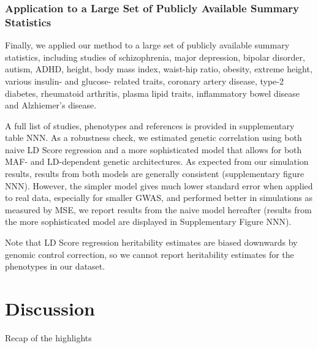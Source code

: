 \documentclass[11pt]{article}
\begin{document}
\subsubsection{Application to a Large Set of Publicly Available Summary Statistics}
Finally, we applied our method to a large set of publicly available summary statistics, 
including studies of 
schizophrenia\cite{schizophrenia2014biological}, 
major depression\cite{ripke2012mega}, 
bipolar disorder\cite{sklar2011large}, 
autism\cite{cross2013identification},
ADHD\cite{neale2010meta},
height\cite{allen2010hundreds}, 
body mass index\cite{speliotes2010association}, 
waist-hip ratio\cite{heid2010meta}, 
obesity\cite{berndt2013genome}, 
extreme height\cite{berndt2013genome}, 
various insulin- and glucose- related traits\cite{prokopenko2014central,scott2012large,manning2012genome,strawbridge2011genome,saxena2010genetic,dupuis2010new,soranzo2010common},
coronary artery disease\cite{schunkert2011large}, 
type-2 diabetes\cite{morris2012large}, 
rheumatoid arthritis\cite{stahl2010genome}, 
plasma lipid traits\cite{teslovich2010biological},
inflammatory bowel disease\cite{jostins2012host} and 
Alzhiemer's disease\cite{lambert2013meta}.

A full list of studies, phenotypes and references is provided in supplementary table NNN.
As a robustness check, we estimated genetic correlation using both naive LD Score regression
and a more sophisticated model that allows for both MAF- and LD-dependent genetic architectures.
As expected from our simulation results, results from both models are generally consistent (supplementary figure NNN). 
However, the simpler model gives much lower standard error when applied to real data, especially for smaller GWAS, 
and performed better in simulations as measured by MSE,
we report results from the naive model hereafter (results from the more sophisticated model are displayed in Supplementary Figure NNN).

Note that LD Score regression heritability estimates are biased downwards by genomic control correction,
so we cannot report heritability estimates for the phenotypes in our dataset. 

\section{Discussion}\label{Discussion}

Recap of the highlights
\end{document}
